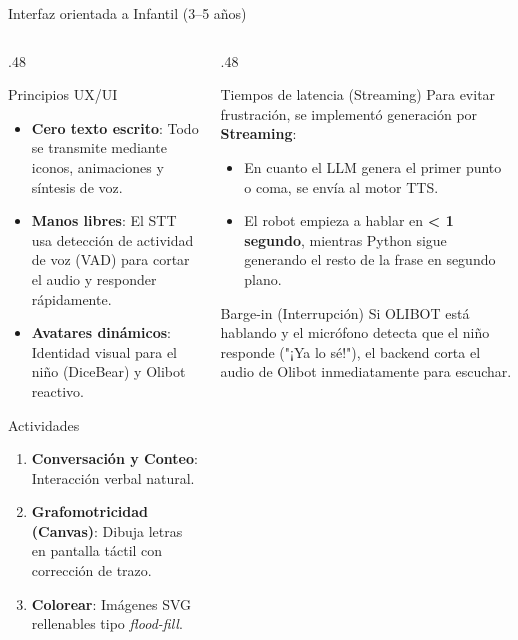 \documentclass[aspectratio=169, 10pt]{beamer}
\begin{document}
\begin{frame}{Interfaz orientada a Infantil (3–5 años)}
  \begin{columns}[T]
    \begin{column}{.48\textwidth}
      \begin{block}{Principios UX/UI}
        \small
        \begin{itemize}
          \item \textbf{Cero texto escrito}: Todo se transmite mediante iconos, animaciones y síntesis de voz.
          \item \textbf{Manos libres}: El STT usa detección de actividad de voz (VAD) para cortar el audio y responder rápidamente.
          \item \textbf{Avatares dinámicos}: Identidad visual para el niño (DiceBear) y Olibot reactivo.
        \end{itemize}
      \end{block}
      \vspace{2pt}
      \begin{block}{Actividades}
        \small
        \begin{enumerate}
          \item \textbf{Conversación y Conteo}: Interacción verbal natural.
          \item \textbf{Grafomotricidad (Canvas)}: Dibuja letras en pantalla táctil con corrección de trazo.
          \item \textbf{Colorear}: Imágenes SVG rellenables tipo \textit{flood-fill}.
        \end{enumerate}
      \end{block}
    \end{column}
    \begin{column}{.48\textwidth}
      \begin{exampleblock}{Tiempos de latencia (Streaming)}
        \small
        Para evitar frustración, se implementó generación por \textbf{Streaming}:
        \begin{itemize}
          \item En cuanto el LLM genera el primer punto o coma, se envía al motor TTS.
          \item El robot empieza a hablar en \textbf{< 1 segundo}, mientras Python sigue generando el resto de la frase en segundo plano.
        \end{itemize}
      \end{exampleblock}
      \vspace{4pt}
      \begin{alertblock}{Barge-in (Interrupción)}
        \small
        Si OLIBOT está hablando y el micrófono detecta que el niño responde ("¡Ya lo sé!"), el backend corta el audio de Olibot inmediatamente para escuchar.
      \end{alertblock}
    \end{column}
  \end{columns}
\end{frame}
\end{document}
